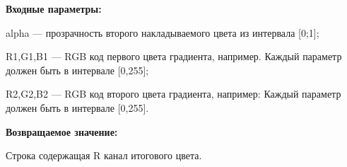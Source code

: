 \textbf{Входные параметры:}  

alpha --- прозрачность второго накладываемого цвета из интервала [0;1];
 
    R1,G1,B1 --- RGB код первого цвета градиента, например. Каждый параметр должен быть в интервале [0,255];
 
    R2,G2,B2 --- RGB код второго цвета градиента, например: Каждый параметр должен быть в интервале [0,255].

\textbf{Возвращаемое значение:}

Строка содержащая R канал итогового цвета.